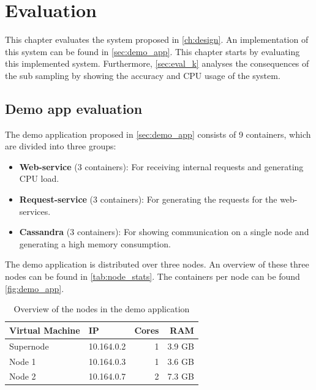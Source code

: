 \chapter{Evaluation}\label{ch:evaluation}
This chapter evaluates the system proposed in \autoref{ch:design}. An implementation of this system can be found in \autoref{sec:demo_app}.  This chapter starts by evaluating this implemented system. Furthermore, \autoref{sec:eval_k} analyses the consequences of the sub sampling by showing the accuracy and CPU usage of the system.

\section{Demo app evaluation} \label{sec:demo_eval}
The demo application proposed in \autoref{sec:demo_app} consists of 9 containers, which are divided into three groups:
\begin{itemize}
    \item \textbf{Web-service} (3 containers): For receiving internal requests and generating CPU load.
    \item \textbf{Request-service} (3 containers): For generating the requests for the web-services.
    \item \textbf{Cassandra} (3 containers): For showing communication on a single node and generating a high memory consumption.
\end{itemize}

\noindent
The demo application is distributed over three nodes. An overview of these three nodes can be found in \autoref{tab:node_stats}. The containers per node can be found \autoref{fig:demo_app}.\\

\begin{table}
    \centering
    \begin{tabular}{l|lrr}
        Virtual Machine &IP & Cores & RAM \\ \hline
        Supernode & 10.164.0.2 & 1 & 3.9 GB \\
        Node 1 & 10.164.0.3 & 1 & 3.6 GB \\
        Node 2 & 10.164.0.7 & 2 & 7.3 GB \\
    \end{tabular}
    \caption{Overview of the nodes in the demo application}
    \label{tab:node_stats}
\end{table}

